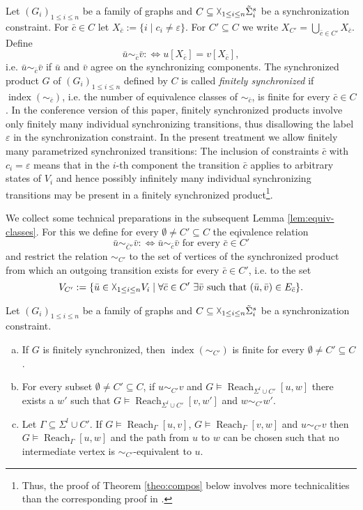 \documentclass{LMCS}
\renewcommand{\epsilon}{\varepsilon}
\DeclareMathOperator{\Reach}{Reach}
\DeclareMathOperator{\ind}{index}
\begin{document}
Let  $(G_i)_{1 \le i \le n}$ be a family of graphs and 
$C \subseteq \vartimes_{1 \le i \le n} \tilde\Sigma_i^s$ be a synchronization
constraint. For $\bar c \in C$ let $X_{\bar c}:=\{i \mid c_i \neq \epsilon\}$. 
For $C' \subseteq C$ we write $X_{C'} = \bigcup_{{\bar c} \in C'} X_{{\bar c}}$.
Define 
\[\bar u \sim_{\bar c} \bar v:\Leftrightarrow u[X_{\bar c}]=v[X_{\bar c}],\]
i.e. $\bar u \sim_{\bar c} \bar v$ if $\bar u$ and $\bar v$ agree on the synchronizing components.
The synchronized product $G$ of $(G_i)_{1 \le i \le n}$ defined by $C$ is called 
\emph{finitely synchronized} if $\ind(\sim_{\bar c})$, i.e. the number 
of equivalence classes of $\sim_{\bar c}$, is finite for every $\bar c \in C$.
In the conference version \cite{wt04} of this paper, finitely synchronized products involve only finitely 
many individual synchronizing transitions, thus disallowing the label $\epsilon$ in
the synchronization constraint. In the present treatment we allow finitely many parametrized 
synchronized transitions: The inclusion of constraints $\bar c$ with $c_i=\epsilon$ means that 
in the $i$-th component the transition $\bar c$ applies to arbitrary states of $V_i$ and hence 
possibly infinitely many individual synchronizing transitions may be present in a finitely 
synchronized product\footnote{Thus, the proof of Theorem \ref{theo:compos} below involves more technicalities
than the corresponding proof in \cite{wt04}.}.

We collect some technical preparations in the subsequent Lemma \ref{lem:equiv-classes}. For this
we define for every $\emptyset \neq C' \subseteq C$ the eqivalence relation 
\[\bar u \sim_{\bar C'} \bar v:\Leftrightarrow \bar u \sim_{\bar c} \bar v \text{ for every } \bar c \in C'\]
and restrict the relation $\sim_{C'}$ to the set of vertices of the synchronized product from
which an outgoing transition exists for every $\bar c \in C'$, i.e. to the set
\[V_{C'}:=\{\bar u \in \vartimes_{1 \le i \le n} V_i \mid \forall \bar c \in C' \ \exists \bar v \text{ such that } 
(\bar u,\bar v) \in E_{\bar c}\}.\]

\begin{lem}\label{lem:equiv-classes}
Let  $(G_i)_{1 \le i \le n}$ be a family of graphs and 
$C \subseteq \vartimes_{1 \le i \le n} \tilde\Sigma_i^s$ be a synchronization
constraint. 
\begin{enumerate}[(a)]
\item If $G$ is finitely synchronized, then $\ind(\sim_{C'})$ is finite for every $\emptyset \neq C' \subseteq C$.
\item For every subset $\emptyset \neq C' \subseteq C$,
if $u \sim_{C'} v$ and $G \models \Reach_{\Sigma^l \cup C'}[u,w]$
there exists a $w'$ such that $G \models \Reach_{\Sigma^l \cup C'}[v,w']$
and $w \sim_{C'}  w'$.
\item Let $\Gamma \subseteq \Sigma^l \cup C'$. If 
 $G \models \Reach_\Gamma[u,v]$, $G \models \Reach_\Gamma[v,w]$
 and $u \sim_{C'} v$ then $G \models \Reach_\Gamma[u, w]$ and the path from 
 $u$ to $w$ can be chosen such that no intermediate vertex is $\sim_{C'}$-equivalent to 
 $u$.
\end{enumerate}
\end{lem}
\end{document}
